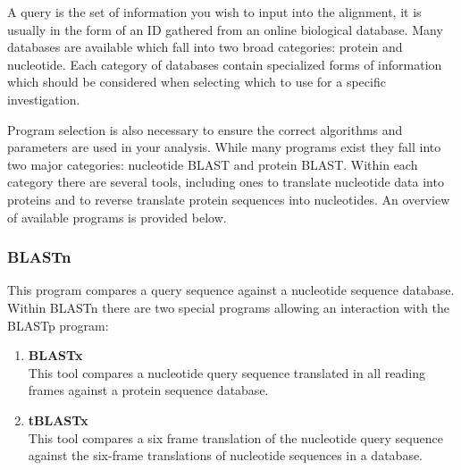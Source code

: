     A query is the set of information you wish to input into the alignment, it is usually in the form of an ID gathered from an online biological database.\autocite{B2} Many databases are available which fall into two broad categories: protein and nucleotide.\autocite{B2} Each category of databases contain specialized forms of information which should be considered when selecting which to use for a specific investigation.\autocite{B2}

    Program selection is also necessary to ensure the correct algorithms and parameters are used in your analysis. While many programs exist they fall into two major categories: nucleotide BLAST and protein BLAST.\autocite{B1} Within each category there are several tools, including ones to translate nucleotide data into proteins and to reverse translate protein sequences into nucleotides.\autocite{B1} An overview of available programs is provided below.


    \begin{center}
         \hspace{10pt}  \hspace{10pt} 
    \end{center}
        \subsubsection{BLASTn}
        This program compares a query sequence against a nucleotide sequence database.\autocite{B1} Within BLASTn there are two special programs allowing an interaction with the BLASTp program:

                \begin{enumerate}
                    
                    \item \textbf{BLASTx} \\
                    This tool compares a nucleotide query sequence translated in all reading frames against a protein sequence database.\autocite{B1}

                    \item \textbf{tBLASTx} \\
                    This tool compares a six frame translation of the nucleotide query sequence against the six-frame translations of nucleotide sequences in a database.\autocite{B1} 
                \end{enumerate}

